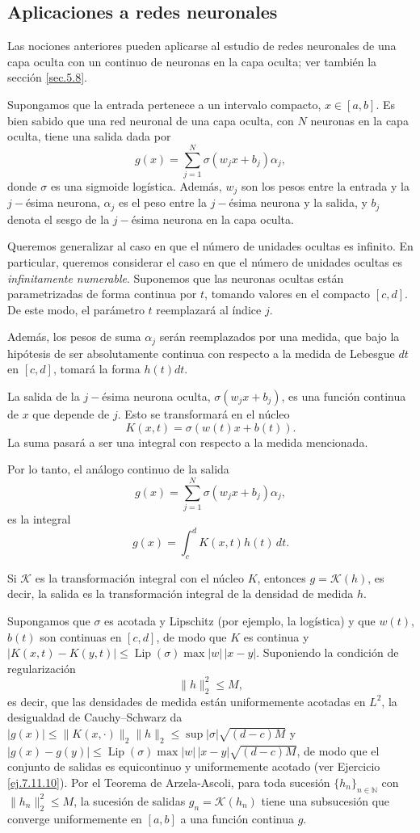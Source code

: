 \documentclass[12pt, a4paper]{amsbook}
\newcommand{\N}{{\mathbb N}}
\theoremstyle{remark}
\theoremstyle{definition}
\numberwithin{section}{chapter}
\numberwithin{subsection}{section}
\numberwithin{equation}{section}
\numberwithin{figure}{chapter}
\begin{document}
\subsection{Aplicaciones a redes neuronales}\label{sec.7.3}

Las nociones anteriores pueden aplicarse al estudio de redes neuronales de una capa oculta con un continuo de neuronas en la capa oculta; ver también la sección \ref{sec.5.8}.

Supongamos que la entrada pertenece a un intervalo compacto, $x \in [a, b]$. Es bien sabido que una red neuronal de una capa oculta, con $N$ neuronas en la capa oculta, tiene una salida dada por  
$$
g(x) = \sum_{j=1}^{N} \sigma(w_j x + b_j) \alpha_j,
$$
donde $\sigma$ es una sigmoide logística. Además, $w_j$ son los pesos entre la entrada y la $j-$ésima neurona, $\alpha_j$ es el peso entre la $j-$ésima neurona y la salida, y $b_j$ denota el sesgo de la $j-$ésima neurona en la capa oculta.

Queremos generalizar al caso en que el número de unidades ocultas es infinito. En particular, queremos considerar el caso en que el número de unidades ocultas es {\em infinitamente numerable}. Suponemos que las neuronas ocultas están parametrizadas de forma continua por $t$, tomando valores en el compacto $[c, d]$. De este modo, el parámetro $t$ reemplazará al índice $j$.  

Además, los pesos de suma $\alpha_j$ serán reemplazados por una medida, que bajo la hipótesis de ser absolutamente continua con respecto a la medida de Lebesgue $dt$ en $[c,d]$, tomará la forma $h(t) dt$.  

La salida de la $j-$ésima neurona oculta, $\sigma(w_j x + b_j)$, es una función continua de $x$ que depende de $j$. Esto se transformará en el núcleo  
$$
K(x, t) = \sigma(w(t)x + b(t)).
$$
La suma pasará a ser una integral con respecto a la medida mencionada.  

Por lo tanto, el análogo continuo de la salida  
$$
g(x) = \sum_{j=1}^{N} \sigma(w_j x + b_j) \alpha_j,
$$
es la integral  
$$
g(x) = \int_c^d K(x, t) h(t)\, dt.
$$

Si $\mathcal K$ es la transformación integral con el núcleo $K$, entonces $g = {\mathcal K}(h)$, es decir, la salida es la transformación integral de la densidad de medida $h$.  

Supongamos que $\sigma$ es acotada y Lipschitz (por ejemplo, la logística) y que $w(t)$, $b(t)$ son continuas en $[c,d]$, de modo que $K$ es continua y $|K(x,t)-K(y,t)|\le \operatorname{Lip}(\sigma)\max|w|\,|x-y|$. Suponiendo la condición de regularización  
$$
\|h\|_2^2 \leq M,
$$
es decir, que las densidades de medida están uniformemente acotadas en $L^2$, la desigualdad de Cauchy--Schwarz da $|g(x)|\le \|K(x,\cdot)\|_2\|h\|_2\le \sup|\sigma|\sqrt{(d-c)M}$ y $|g(x)-g(y)|\le \operatorname{Lip}(\sigma)\max|w|\,|x-y|\sqrt{(d-c)M}$, de modo que el conjunto de salidas es equicontinuo y uniformemente acotado (ver Ejercicio \ref{ej.7.11.10}). Por el Teorema de Arzela-Ascoli, para toda sucesión $\{h_n\}_{n\in\N}$ con $\|h_n\|_2^2\le M$, la sucesión de salidas $g_n = {\mathcal K}(h_n)$ tiene una subsucesión que converge uniformemente en $[a,b]$ a una función continua $g$.  
\end{document}
